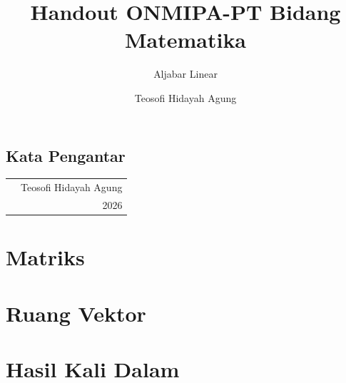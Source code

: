 \documentclass[lang=id,12pt]{beautybook}
\renewcommand{\encodingdefault}{OT1}
\renewcommand{\rmdefault}{cmr}
\newcommand{\handoutdesignfont}{%
    \renewcommand{\encodingdefault}{T1}%
    \renewcommand{\rmdefault}{ptm}%
    \fontencoding{T1}\fontfamily{ptm}\selectfont}
\theoremstyle{definition}
\theoremstyle{plain}
\begin{document}
\thispagestyle{empty}
\title{Handout ONMIPA-PT Bidang Matematika}
\subtitle{Aljabar Linear}
\bookseries{}
\author{Teosofi Hidayah Agung}
\hypersetup{pageanchor=false}
{\handoutdesignfont\makecover}

\makeatletter
\oddoutermargin{\sffamily \leftmark}
\evenoutermargin{\sffamily\@title}
\chapimage{}
\makeatother


\frontmatter
{}
\hypersetup{pageanchor=true}

{\thispagestyle{empty}
    \chapter*{Kata Pengantar}
    

    \hfill
    \begin{tabular}{lr}
         & Teosofi Hidayah Agung \\
         & 2026
    \end{tabular}
    \clearpage}

\thispagestyle{empty}
{\normalfont\tableofcontents}\let\cleardoublepage\clearpage

\mainmatter
{}
\part{Matriks}{}






\part{Ruang Vektor}{}




\part{Hasil Kali Dalam}{}




\nocite{zhang2009,zhang2011}


\end{document}
